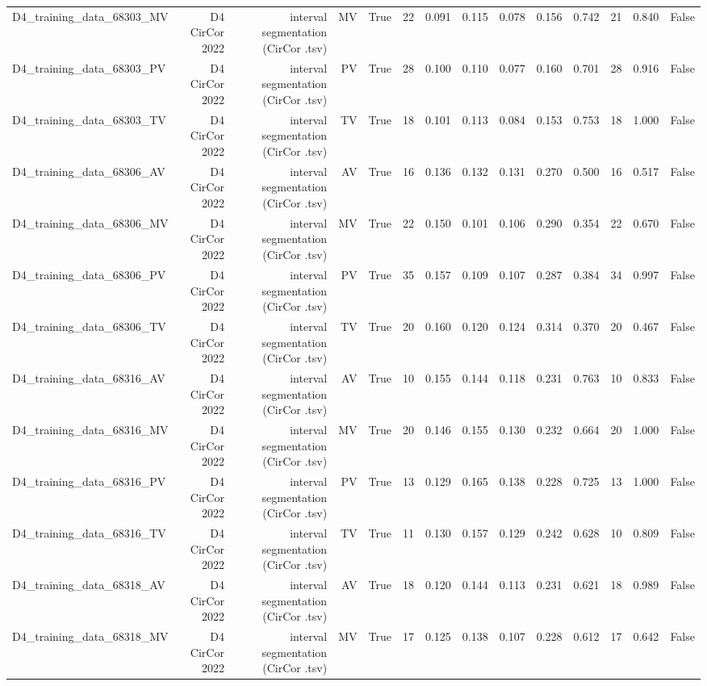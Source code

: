 \begin{table}[htbp]
\begin{tabular}{lrrrrrrrrrrrrr}
    D4\_training\_data\_68303\_MV & D4 CirCor 2022 & interval segmentation (CirCor .tsv) & MV & True & 22 & 0.091 & 0.115 & 0.078 & 0.156 & 0.742 & 21 & 0.840 & False \\
    D4\_training\_data\_68303\_PV & D4 CirCor 2022 & interval segmentation (CirCor .tsv) & PV & True & 28 & 0.100 & 0.110 & 0.077 & 0.160 & 0.701 & 28 & 0.916 & False \\
    D4\_training\_data\_68303\_TV & D4 CirCor 2022 & interval segmentation (CirCor .tsv) & TV & True & 18 & 0.101 & 0.113 & 0.084 & 0.153 & 0.753 & 18 & 1.000 & False \\
    D4\_training\_data\_68306\_AV & D4 CirCor 2022 & interval segmentation (CirCor .tsv) & AV & True & 16 & 0.136 & 0.132 & 0.131 & 0.270 & 0.500 & 16 & 0.517 & False \\
    D4\_training\_data\_68306\_MV & D4 CirCor 2022 & interval segmentation (CirCor .tsv) & MV & True & 22 & 0.150 & 0.101 & 0.106 & 0.290 & 0.354 & 22 & 0.670 & False \\
    D4\_training\_data\_68306\_PV & D4 CirCor 2022 & interval segmentation (CirCor .tsv) & PV & True & 35 & 0.157 & 0.109 & 0.107 & 0.287 & 0.384 & 34 & 0.997 & False \\
    D4\_training\_data\_68306\_TV & D4 CirCor 2022 & interval segmentation (CirCor .tsv) & TV & True & 20 & 0.160 & 0.120 & 0.124 & 0.314 & 0.370 & 20 & 0.467 & False \\
    D4\_training\_data\_68316\_AV & D4 CirCor 2022 & interval segmentation (CirCor .tsv) & AV & True & 10 & 0.155 & 0.144 & 0.118 & 0.231 & 0.763 & 10 & 0.833 & False \\
    D4\_training\_data\_68316\_MV & D4 CirCor 2022 & interval segmentation (CirCor .tsv) & MV & True & 20 & 0.146 & 0.155 & 0.130 & 0.232 & 0.664 & 20 & 1.000 & False \\
    D4\_training\_data\_68316\_PV & D4 CirCor 2022 & interval segmentation (CirCor .tsv) & PV & True & 13 & 0.129 & 0.165 & 0.138 & 0.228 & 0.725 & 13 & 1.000 & False \\
    D4\_training\_data\_68316\_TV & D4 CirCor 2022 & interval segmentation (CirCor .tsv) & TV & True & 11 & 0.130 & 0.157 & 0.129 & 0.242 & 0.628 & 10 & 0.809 & False \\
    D4\_training\_data\_68318\_AV & D4 CirCor 2022 & interval segmentation (CirCor .tsv) & AV & True & 18 & 0.120 & 0.144 & 0.113 & 0.231 & 0.621 & 18 & 0.989 & False \\
    D4\_training\_data\_68318\_MV & D4 CirCor 2022 & interval segmentation (CirCor .tsv) & MV & True & 17 & 0.125 & 0.138 & 0.107 & 0.228 & 0.612 & 17 & 0.642 & False \\

\end{tabular}
\end{table}
